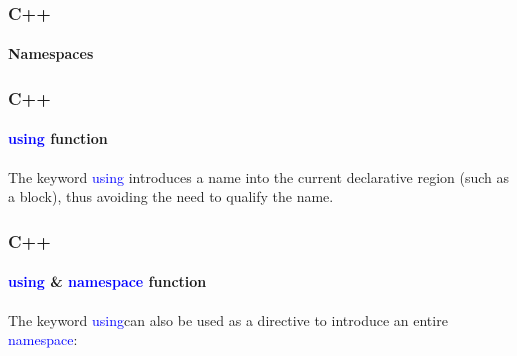 \documentclass[hyperref={pdfpagelabels=true}]{beamer}
\begin{document}
\begin{frame}[shrink]
\frametitle{C++}
\framesubtitle{Namespaces}
\begin{tcolorbox}[title= ,width=11.85 cm]
\tiny

\end{tcolorbox}
\end{frame}

\begin{frame}[shrink]
\frametitle{C++}
\framesubtitle{\textcolor{blue}{using} function}
The keyword \textcolor{blue}{using} introduces a name into the current declarative region (such as a block), thus avoiding the need to qualify the name. 
\pause
\begin{tcolorbox}[title= ,width=11.85 cm]
\tiny

\end{tcolorbox}
\end{frame}

\begin{frame}[shrink]
\frametitle{C++}
\framesubtitle{\textcolor{blue}{using} \& \textcolor{blue}{namespace} function}
The keyword \textcolor{blue}{using}can also be used as a directive to introduce an entire \textcolor{blue}{namespace}:
\pause
\begin{tcolorbox}[title= ,width=11.85 cm]
\tiny

\end{tcolorbox}
\end{frame}
\end{document}
